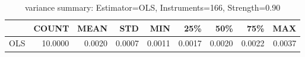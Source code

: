 \begin{table}[ht]
\centering
\caption{variance summary: Estimator=OLS, Instruments=166, Strength=0.90}
\begin{tabular}{lrrrrrrrr}
\toprule
 & COUNT & MEAN & STD & MIN & 25\% & 50\% & 75\% & MAX \\
\midrule
OLS & 10.0000 & 0.0020 & 0.0007 & 0.0011 & 0.0017 & 0.0020 & 0.0022 & 0.0037 \\
\bottomrule
\end{tabular}
\end{table}
